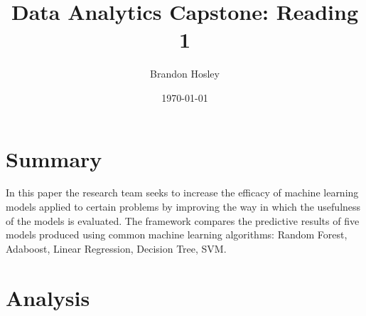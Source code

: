 \documentclass[]{article}
\title{Data Analytics Capstone: Reading 1}
\author{Brandon Hosley}
\date{\today}
\begin{document}
	\maketitle
	
\section{Summary} 

In this paper\cite{Lakkaraju2015} the research team seeks to increase the efficacy of machine learning models applied to certain problems by improving the way in which the usefulness of the models is evaluated. The framework compares the predictive results of five models produced using common machine learning algorithms: Random Forest, Adaboost, Linear Regression, Decision Tree, SVM.


\section{Analysis}




\clearpage


\end{document}
